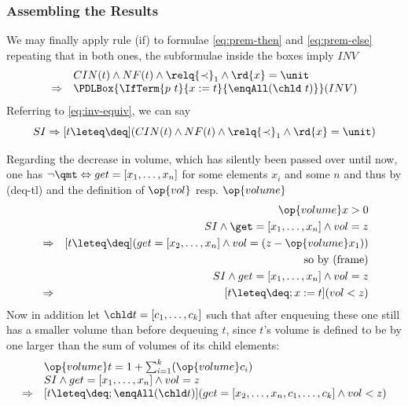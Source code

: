 \subsubsection{Assembling the Results}

We may finally apply rule (if) to formulae \eqref{eq:prem-then} and
\eqref{eq:prem-else} repeating that in both ones, the subformulae inside the
boxes imply $INV$
\begin{equation}
\label{eq:concl-if}
\begin{array}{l@{\quad}l}
&  CIN(t) \land NF(t) \land \relq {\prec}_1 \land \rd{x} =  \unit \\
\Rightarrow & \PDLBox{\IfTerm{p\ t}{x:=t}{\enqAll (\chld\ t)}}(INV)
\end{array}
\end{equation}
Referring to \eqref{eq:inv-equiv}, we can say
\begin{equation}
\label{eq:si-deq}
SI \Rightarrow [t \leteq \deq](CIN(t) \land NF(t) \land \relq {\prec}_1 \land \rd{x} =  \unit )
\end{equation}

Regarding the decrease in volume, which has silently been passed over until now,
one has $\lnot \qmt \Leftrightarrow get = [x_1,\ldots,x_n]$ for some elements $x_i$ and some $n$ and
thus by (deq-tl) and the definition of $\op{vol}$ resp. $\op{volume}$
\begin{eqnarray}
\label{eq:then-vol}
&& \op{volume} x > 0 \nonumber \\
&& SI \land \get = [x_1,\ldots,x_n] \land vol = z \nonumber \\ {}
& \Rightarrow &[t \leteq \deq](get = [x_2,\ldots,x_n] \land vol = (z - \op{volume} x_1))
    \nonumber \\
&& \text{so by (frame)} \nonumber\\
& & SI \land get = [x_1,\ldots,x_n] \land vol = z \\
&\Rightarrow& [t \leteq \deq; x:= t](vol < z) \nonumber
\end{eqnarray}
Now in addition let $\chld t = [c_1,\ldots,c_k]$ such that after enqueuing these one
still has a smaller volume than before dequeuing $t$, since $t$'s volume is
defined to be by one larger than the sum of volumes of its child elements:
\begin{equation}
\label{eq:else-vol}
\begin{array}{ll}
& \op{volume} t = 1 + \sum_{i=1}^{k}(\op{volume} c_i)\\
& SI \land get = [x_1,\ldots,x_n] \land vol = z \\
\Rightarrow & [t \leteq \deq; \enqAll (\chld t)](get = [x_2,\ldots,x_n,c_1,\ldots,c_k] \land vol < z)
\end{array}
\end{equation}

